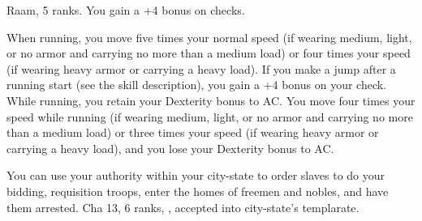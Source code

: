 {Raam,  5 ranks.}
{You gain a +4 bonus on  checks.}

{}{}
{When running, you move five times your normal speed (if wearing medium, light, or no armor and carrying no more than a medium load) or four times your speed (if wearing heavy armor or carrying a heavy load). If you make a jump after a running start (see the  skill description), you gain a +4 bonus on your  check. While running, you retain your Dexterity bonus to AC.}
{You move four times your speed while running (if wearing medium, light, or no armor and carrying no more than a medium load) or three times your speed (if wearing heavy armor or carrying a heavy load), and you lose your Dexterity bonus to AC.}{}

{You can use your authority within your city-state to order slaves to do your bidding, requisition troops, enter the homes of freemen and nobles, and have them arrested.}
{Cha 13,  6 ranks, , accepted into city-state's templarate.}
